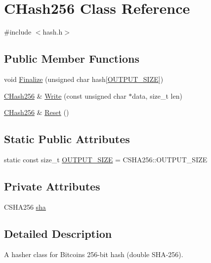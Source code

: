 \hypertarget{class_c_hash256}{}\section{C\+Hash256 Class Reference}
\label{class_c_hash256}


{\ttfamily \#include $<$hash.\+h$>$}

\subsection*{Public Member Functions}
\begin{DoxyCompactItemize}
\item 
void \mbox{\hyperlink{class_c_hash256_aa8a70c1b7cf24ce7d00240a1131cf4e7}{Finalize}} (unsigned char hash\mbox{[}\mbox{\hyperlink{class_c_hash256_a6812a40441acb1c3b7f10c7e38c7d467}{O\+U\+T\+P\+U\+T\+\_\+\+S\+I\+ZE}}\mbox{]})
\item 
\mbox{\hyperlink{class_c_hash256}{C\+Hash256}} \& \mbox{\hyperlink{class_c_hash256_a9cc25033c6435cb28e2e8e377c949a7a}{Write}} (const unsigned char $\ast$data, size\+\_\+t len)
\item 
\mbox{\hyperlink{class_c_hash256}{C\+Hash256}} \& \mbox{\hyperlink{class_c_hash256_ab25b00e4cda7e209173f2ce90475953d}{Reset}} ()
\end{DoxyCompactItemize}
\subsection*{Static Public Attributes}
\begin{DoxyCompactItemize}
\item 
static const size\+\_\+t \mbox{\hyperlink{class_c_hash256_a6812a40441acb1c3b7f10c7e38c7d467}{O\+U\+T\+P\+U\+T\+\_\+\+S\+I\+ZE}} = C\+S\+H\+A256\+::\+O\+U\+T\+P\+U\+T\+\_\+\+S\+I\+ZE
\end{DoxyCompactItemize}
\subsection*{Private Attributes}
\begin{DoxyCompactItemize}
\item 
C\+S\+H\+A256 \mbox{\hyperlink{class_c_hash256_af06b992e00e1bd7290388aed522a535f}{sha}}
\end{DoxyCompactItemize}


\subsection{Detailed Description}
A hasher class for Bitcoin\textquotesingle{}s 256-\/bit hash (double S\+H\+A-\/256). 

